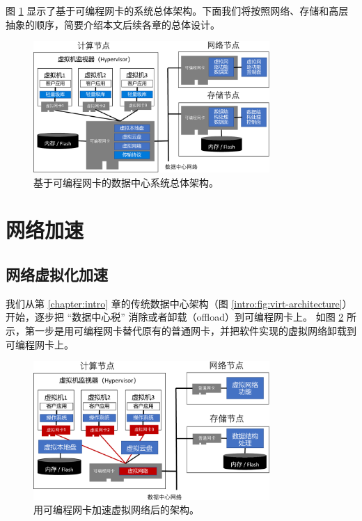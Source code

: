 图 \ref{arch:fig:accel-arch} 显示了基于可编程网卡的系统总体架构。下面我们将按照网络、存储和高层抽象的顺序，简要介绍本文后续各章的总体设计。


\begin{figure}[htbp]
	\centering
	\includegraphics[width=0.8\textwidth]{figures/accel_arch.pdf}
	\caption{基于可编程网卡的数据中心系统总体架构。}
	\label{arch:fig:accel-arch}
\end{figure}



\section{网络加速}

\subsection{网络虚拟化加速}

我们从第 \ref{chapter:intro} 章的传统数据中心架构（图 \ref{intro:fig:virt-architecture}）开始，逐步把 ``数据中心税'' 消除或者卸载（offload）到可编程网卡上。
如图 \ref{arch:fig:virtual-network} 所示，第一步是用可编程网卡替代原有的普通网卡，并把软件实现的虚拟网络卸载到可编程网卡上。

\begin{figure}[htbp]
	\centering
	\includegraphics[width=0.8\textwidth]{figures/virtual_network.pdf}
	\caption{用可编程网卡加速虚拟网络后的架构。}
	\label{arch:fig:virtual-network}
\end{figure}


